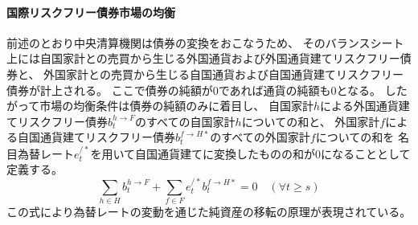 \paragraph{国際リスクフリー債券市場の均衡}
\label{sec:chapter3_assumptions_bond_markets_international_equilibrium}
前述のとおり中央清算機関は債券の変換をおこなうため、
そのバランスシート上には自国家計との売買から生じる外国通貨および外国通貨建てリスクフリー債券と、
外国家計との売買から生じる自国通貨および自国通貨建てリスクフリー債券が計上される。
ここで債券の純額が0であれば通貨の純額も0となる。
したがって市場の均衡条件は債券の純額のみに着目し、
自国家計\(h\)による外国通貨建てリスクフリー債券\(b_t^{h\to F}\)のすべての自国家計\(h\)についての和と、
外国家計\(f\)による自国通貨建てリスクフリー債券\(b_t^{f\to H*}\)のすべての外国家計\(f\)についての和を
名目為替レート\(e_t^{/*}\)を用いて自国通貨建てに変換したものの和が0になることとして定義する。
\begin{equation}
\label{form:chapter3_assumptions_bond_markets_international_equilibrium}
    \sum_{h\in H}b_t^{h\to F}+\sum_{f\in F}e_t^{/*}b_t^{f\to H*}=0 \quad (\forall t\ge s)
\end{equation}
この式により為替レートの変動を通じた純資産の移転の原理が表現されている。